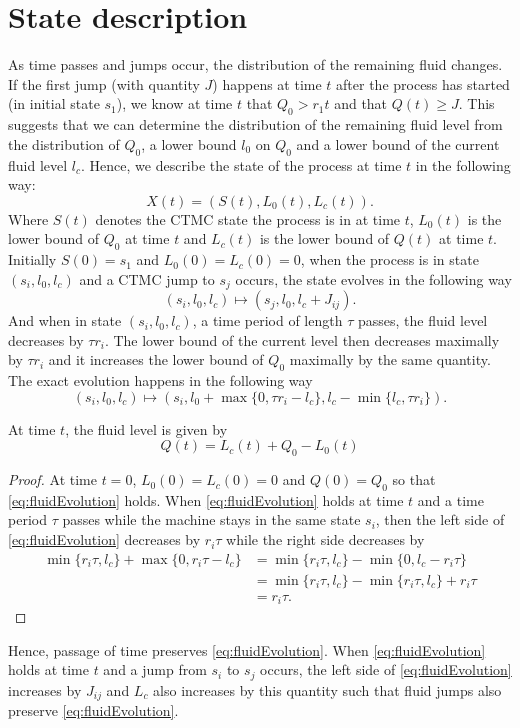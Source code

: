 \section{State description}
As time passes and jumps occur, the distribution of the remaining fluid changes.
If the first jump (with quantity $J$) happens at time $t$ after the process has started (in initial state $s_1$), we know at time $t$ that $Q_0>r_1t$ and that $Q(t)\geq J$.
This suggests that we can determine the distribution of the remaining fluid level from the distribution of $Q_0$, a lower bound $l_0$ on $Q_0$ and a lower bound of the current fluid level $l_c$.
Hence, we describe the state of the process at time $t$ in the following way:
$$
X(t)=(S(t),L_0(t),L_c(t)).
$$
Where $S(t)$ denotes the CTMC state the process is in at time $t$, $L_0(t)$ is the lower bound of $Q_0$ at time $t$ and $L_c(t)$ is the lower bound of $Q(t)$ at time $t$.
Initially $S(0)=s_1$ and $L_0(0)=L_c(0)=0$, when the process is in state $(s_i,l_0,l_c)$ and a CTMC jump to $s_j$ occurs, the state evolves in the following way
$$
(s_i,l_0,l_c)\mapsto (s_j,l_0,l_c+J_{ij}).
$$
And when in state $(s_i,l_0,l_c)$, a time period of length $\tau$ passes, the fluid level decreases by $\tau r_i$.
The lower bound of the current level then decreases maximally by $\tau r_i$ and it increases the lower bound of $Q_0$ maximally by the same quantity.
The exact evolution happens in the following way
$$
(s_i,l_0,l_c)\mapsto (s_i,l_0+\max\{0,\tau r_i-l_c\},l_c-\min\{l_c,\tau r_i\}).
$$
\begin{theorem}
At time $t$, the fluid level is given by
\begin{equation}\label{eq:fluidEvolution}
Q(t)=L_c(t)+Q_0-L_0(t)
\end{equation}
\end{theorem}
\begin{proof}
At time $t=0$, $L_0(0)=L_c(0)=0$ and $Q(0)=Q_0$ so that \eqref{eq:fluidEvolution} holds.
When \eqref{eq:fluidEvolution} holds at time $t$ and a time period $\tau$ passes while the machine stays in the same state $s_i$, then the left side of \eqref{eq:fluidEvolution} decreases by $r_i\tau$ while the right side decreases by
\begin{equation}
\begin{split}
\min\{r_i\tau,l_c\}+\max\{0,r_i\tau-l_c\}&=\min\{r_i\tau,l_c\}-\min\{0,l_c-r_i\tau\}\\
&=\min\{r_i\tau,l_c\}-\min\{r_i\tau,l_c\}+r_i\tau\\
&=r_i\tau.
\end{split}
\end{equation}
\end{proof}
Hence, passage of time preserves \eqref{eq:fluidEvolution}.
When \eqref{eq:fluidEvolution} holds at time $t$ and a jump from $s_i$ to $s_j$ occurs, the left side of \eqref{eq:fluidEvolution} increases by $J_{ij}$ and $L_c$ also increases by this quantity such that fluid jumps also preserve \eqref{eq:fluidEvolution}.
